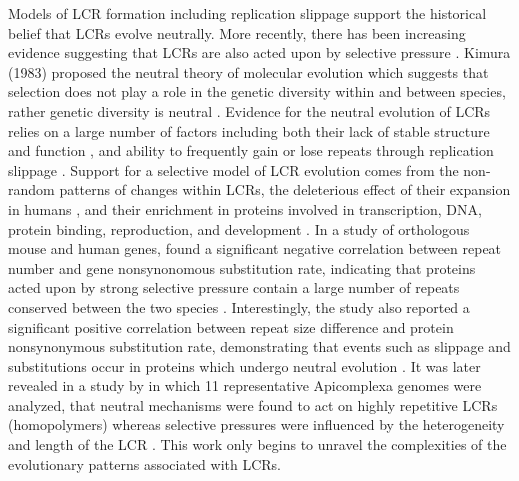\documentclass[10pt]{article}
\begin{document}
Models of LCR formation including replication slippage support the historical belief that LCRs evolve neutrally. More
recently, there has been increasing evidence suggesting that LCRs are also acted upon by selective pressure \citep{haerty2010low}. Kimura (1983) proposed the neutral theory of molecular evolution which suggests that selection does not play a role
in the genetic diversity within and between species, rather genetic diversity is neutral \citep{nevo2001genetic}. Evidence for the neutral evolution of LCRs relies on a large number of factors including both their lack of stable structure and function \citep{dunker2002intrinsic, haerty2010low}, and ability to frequently gain or lose repeats through replication slippage \citep{marcotte1999census, kruglyak1998equilibrium, huntley2000evolution}. Support for a selective model of LCR evolution comes from the non-random patterns of changes within LCRs, the deleterious effect of their expansion in humans \citep{karlin2002amino}, and their
enrichment in proteins involved in transcription, DNA, protein binding, reproduction, and development \citep{huntley2007evolutionary, haerty2010genome, battistuzzi2016profiles}. In a study of orthologous mouse and human genes, \citet{mularoni2007highly} found a significant negative correlation between repeat number and gene nonsynonomous substitution rate, indicating
that proteins acted upon by strong selective pressure contain a large number of repeats conserved between the two species
\citep{mularoni2007highly}. Interestingly, the study also reported a significant positive correlation between repeat size difference
and protein nonsynonymous substitution rate, demonstrating that events such as slippage and substitutions occur in proteins
which undergo neutral evolution \citep{mularoni2007highly}. It was later revealed in a study by \citet{battistuzzi2016profiles} in which 11 representative Apicomplexa genomes were analyzed, that neutral mechanisms were found to act on highly repetitive LCRs
(homopolymers) whereas selective pressures were influenced by the heterogeneity and length of the LCR \citep{battistuzzi2016profiles}. This work only begins to unravel the complexities of the evolutionary patterns associated with LCRs.
\end{document}
